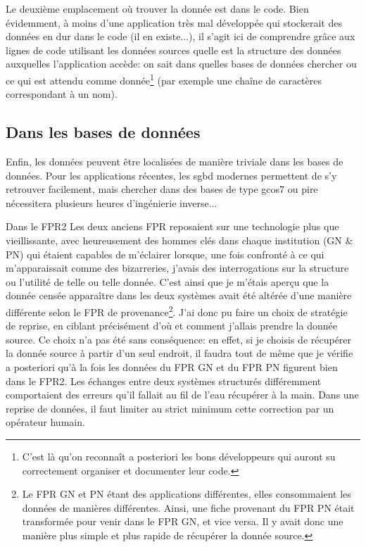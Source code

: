 \documentclass{book}
\begin{document}
Le deuxième emplacement où trouver la donnée est dans le code. Bien évidemment, à moins d'une application très mal développée qui stockerait des données en dur dans le code (il en existe...), il s'agit ici de comprendre grâce aux lignes de code utilisant les données sources quelle est la structure des données auxquelles l'application accède: on sait dans quelles bases de données chercher ou ce qui est attendu comme donnée\footnote{C'est là qu'on reconnaît a posteriori les bons développeurs qui auront su correctement organiser et documenter leur code.} (par exemple une chaîne de caractères correspondant à un nom).

\subsection{Dans les bases de données}

Enfin, les données peuvent être localisées de manière triviale dans les bases de données. Pour les applications récentes, les \gls{sgbd} modernes permettent de s'y retrouver facilement, mais chercher dans des bases de type \gls{gcos7} ou pire nécessitera plusieurs heures d'ingénierie inverse...

\begin{bclogo}[arrondi = 0.1, couleur = blue!10, logo = \bcinfo]{Dans le FPR2}
Les deux anciens FPR reposaient sur une technologie plus que vieillissante, avec heureusement des hommes clés dans chaque institution (GN \& PN) qui étaient capables de m'éclairer lorsque, une fois confronté à ce qui m'apparaissait comme des bizarreries, j'avais des interrogations sur la structure ou l'utilité de telle ou telle donnée.
C'est ainsi que je m'étais aperçu que la donnée censée apparaître dans les deux systèmes avait été altérée d'une manière différente selon le FPR de provenance\footnote{Le FPR GN et PN étant des applications différentes, elles consommaient les données de manières différentes. Ainsi, une fiche provenant du FPR PN était transformée pour venir dans le FPR GN, et vice versa. Il y avait donc une manière plus simple et plus rapide de récupérer la donnée source.}. J'ai donc pu faire un choix de stratégie de reprise, en ciblant précisément d'où et comment j'allais prendre la donnée source.
Ce choix n'a pas été sans conséquence: en effet, si je choisis de récupérer la donnée source à partir d'un seul endroit, il faudra tout de même que je vérifie a posteriori qu'à la fois les données du FPR GN et du FPR PN figurent bien dans le FPR2. Les échanges entre deux systèmes structurés différemment comportaient des erreurs qu'il fallait au fil de l'eau récupérer à la main. Dans une reprise de données, il faut limiter au strict minimum cette correction par un opérateur humain.
\end{bclogo}
\end{document}
